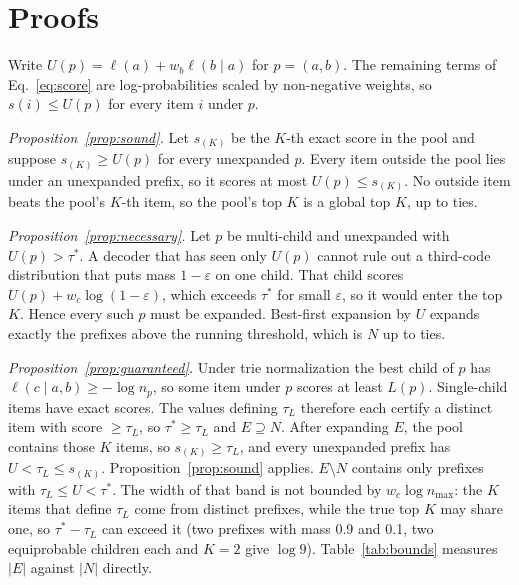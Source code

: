 \documentclass[sigconf,anonymous]{acmart}
\newcommand{\lp}{\ell}
\newcommand{\U}{U}
\begin{document}



\appendix
\section{Proofs}
\label{app:proofs}
Write $\U(p)=\lp(a)+w_b\lp(b\mid a)$ for $p=(a,b)$. The remaining terms of Eq.~\ref{eq:score} are
log-probabilities scaled by non-negative weights, so $s(i)\le\U(p)$ for every item $i$ under $p$.

\emph{Proposition~\ref{prop:sound}.} Let $s_{(K)}$ be the $K$-th exact score in the pool and suppose
$s_{(K)}\ge\U(p)$ for every unexpanded $p$. Every item outside the pool lies under an unexpanded prefix, so it
scores at most $\U(p)\le s_{(K)}$. No outside item beats the pool's $K$-th item, so the pool's top $K$ is a
global top $K$, up to ties.

\emph{Proposition~\ref{prop:necessary}.} Let $p$ be multi-child and unexpanded with $\U(p)>\tau^*$. A decoder that
has seen only $\U(p)$ cannot rule out a third-code distribution that puts mass $1-\varepsilon$ on one child. That
child scores $\U(p)+w_c\log(1-\varepsilon)$, which exceeds $\tau^*$ for small $\varepsilon$, so it would enter the
top $K$. Hence every such $p$ must be expanded. Best-first expansion by $\U$ expands exactly the prefixes above
the running threshold, which is $N$ up to ties.

\emph{Proposition~\ref{prop:guaranteed}.} Under trie normalization the best child of $p$ has
$\lp(c\mid a,b)\ge-\log n_p$, so some item under $p$ scores at least $L(p)$. Single-child items have exact scores.
The values defining $\tau_L$ therefore each certify a distinct item with score $\ge\tau_L$, so $\tau^*\ge\tau_L$
and $E\supseteq N$. After expanding $E$, the pool contains those $K$ items, so $s_{(K)}\ge\tau_L$, and every
unexpanded prefix has $\U<\tau_L\le s_{(K)}$. Proposition~\ref{prop:sound} applies. $E\setminus N$ contains only
prefixes with $\tau_L\le\U<\tau^*$. The width of that band is not bounded by $w_c\log n_{\max}$: the $K$ items
that define $\tau_L$ come from distinct prefixes, while the true top $K$ may share one, so $\tau^*-\tau_L$ can
exceed it (two prefixes with mass 0.9 and 0.1, two equiprobable children each and $K=2$ give $\log 9$).
Table~\ref{tab:bounds} measures $|E|$ against $|N|$ directly.
\end{document}
